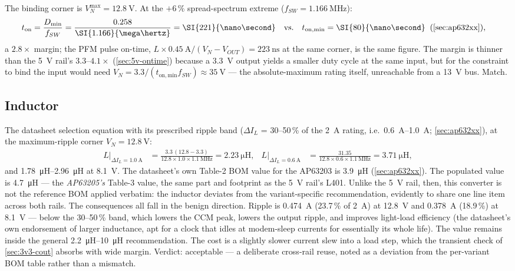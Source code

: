 The binding corner is $V_N^{\max}=\SI{12.8}{\volt}$. At the $+6\,\%$ spread-spectrum
extreme ($f_{SW}=\SI{1.166}{\mega\hertz}$):
\begin{align*}
  t_{\mathrm{on}} &= \frac{D_{\min}}{f_{SW}}
    = \frac{0.258}{\SI{1.166}{\mega\hertz}} = \SI{221}{\nano\second}
    \quad\text{vs.}\quad t_{\mathrm{on,min}} = \SI{80}{\nano\second}
    \;\;(\cref{sec:ap632xx}),
\end{align*}
a $2.8\times$ margin; the PFM pulse on-time, $L\times\SI{0.45}{\ampere}/(V_N-V_{OUT}) =
\SI{223}{\nano\second}$ at the same corner, is the same figure. The margin is thinner
than the 5~V rail's $3.3$--$4.1\times$ (\cref{sec:5v-ontime}) because a 3.3~V output
yields a smaller duty cycle at the same input, but for the constraint to bind the input
would need $V_N = 3.3/(t_{\mathrm{on,min}} f_{SW}) \approx \SI{35}{\volt}$ --- the
absolute-maximum rating itself, unreachable from a 13~V bus. Match.

\subsection{Inductor}\label{sec:3v3-inductor}

The datasheet selection equation with its prescribed ripple band ($\Delta I_L$ =
30--50\,\% of the \SI{2}{\ampere} rating, i.e.\ \SIrange{0.6}{1.0}{\ampere};
\cref{sec:ap632xx}), at the maximum-ripple corner $V_N=\SI{12.8}{\volt}$:
\begin{align*}
  L\big|_{\Delta I_L = \SI{1.0}{\ampere}} &=
    \frac{3.3\,(12.8-3.3)}{12.8 \times 1.0 \times \SI{1.1}{\mega\hertz}}
    = \SI{2.23}{\micro\henry},
  &
  L\big|_{\Delta I_L = \SI{0.6}{\ampere}} &=
    \frac{31.35}{12.8 \times 0.6 \times \SI{1.1}{\mega\hertz}} = \SI{3.71}{\micro\henry},
\end{align*}
and \SIrange{1.78}{2.96}{\micro\henry} at \SI{8.1}{\volt}. The datasheet's own Table-2
BOM value for the AP63203 is \SI{3.9}{\micro\henry} (\cref{sec:ap632xx}). The populated
value is \SI{4.7}{\micro\henry} --- the \emph{AP63205's} Table-3 value, the same part
and footprint as the 5~V rail's L401. Unlike the 5~V rail, then, this converter is not
the reference BOM applied verbatim: the inductor deviates from the variant-specific
recommendation, evidently to share one line item across both rails. The consequences
all fall in the benign direction. Ripple is \SI{0.474}{\ampere} (23.7\,\% of
\SI{2}{\ampere}) at \SI{12.8}{\volt} and \SI{0.378}{\ampere} (18.9\,\%) at
\SI{8.1}{\volt} --- below the 30--50\,\% band, which lowers the CCM peak, lowers the
output ripple, and improves light-load efficiency (the datasheet's own endorsement of
larger inductance, apt for a clock that idles at modem-sleep currents for essentially
its whole life). The value remains inside the general \SIrange{2.2}{10}{\micro\henry}
recommendation. The cost is a slightly slower current slew into a load step, which the
transient check of \cref{sec:3v3-cout} absorbs with wide margin. Verdict: acceptable ---
a deliberate cross-rail reuse, noted as a deviation from the per-variant BOM table
rather than a mismatch.

